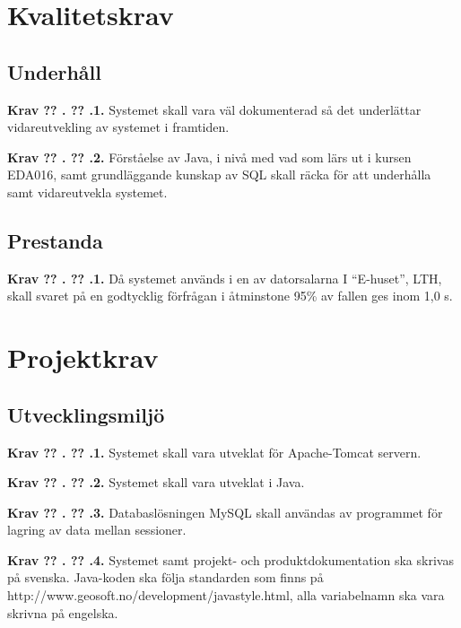 \documentclass[a4paper]{article}
\newcommand\getcurrentref[1]{%
 \ifnumequal{\value{#1}}{0}
  {??}
  {\the\value{#1}}%
}
\newcommand\requirement[2]{
	\numberedrow{Krav}{#1}{#2}
}
\newcommand\numberedrow[3]{
	\noindent
	\textbf{#1 \getcurrentref{section}.\getcurrentref{subsection}.#2.} #3
	
}
\begin{document}
\section{Kvalitetskrav}
\subsection{Underhåll}
\requirement{1}{Systemet skall vara väl dokumenterad så det underlättar vidareutvekling av systemet i framtiden.}
\requirement{2}{Förståelse av Java, i nivå med vad som lärs ut i kursen EDA016, samt grundläggande kunskap av SQL skall räcka för att underhålla samt vidareutvekla systemet.}
\subsection{Prestanda}
\requirement{1}{Då systemet används i en av datorsalarna I “E-huset”, LTH, skall svaret på en godtycklig förfrågan i åtminstone 95\% av fallen ges inom 1,0 s.}
\section{Projektkrav}
\subsection{Utvecklingsmiljö}
\requirement{1}{Systemet skall vara utveklat för Apache-Tomcat servern.}
\requirement{2}{Systemet skall vara utveklat i Java.}
\requirement{3}{Databaslösningen MySQL skall användas av programmet för lagring av data mellan sessioner.}
\requirement{4}{Systemet samt projekt- och produktdokumentation ska skrivas på svenska. Java-koden ska följa standarden som finns på http://www.geosoft.no/development/javastyle.html, alla variabelnamn ska vara skrivna på engelska.}
\end{document}
